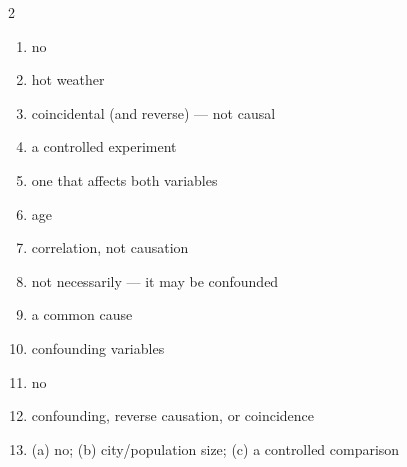 \documentclass[11pt]{article}
\begin{document}
\begin{keybox}
\begin{multicols}{2}
\small
\begin{enumerate}[leftmargin=*,itemsep=3pt]
  \item no
  \item hot weather
  \item coincidental (and reverse) --- not causal
  \item a controlled experiment
  \item one that affects both variables
  \item age
  \item correlation, not causation
  \item not necessarily --- it may be confounded
  \item a common cause
  \item confounding variables
  \item no
  \item confounding, reverse causation, or coincidence
  \item (a) no; (b) city/population size; (c) a controlled comparison
\end{enumerate}
\end{multicols}
\end{keybox}
\end{document}
